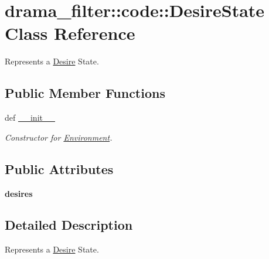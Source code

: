 \hypertarget{classdrama__filter_1_1code_1_1DesireState}{
\section{drama\_\-filter::code::DesireState Class Reference}
\label{classdrama__filter_1_1code_1_1DesireState}
}


Represents a \hyperlink{classdrama__filter_1_1code_1_1Desire}{Desire} State.  


\subsection*{Public Member Functions}
\begin{DoxyCompactItemize}
\item 
def \hyperlink{classdrama__filter_1_1code_1_1DesireState_a8dc2a08bd1ecc7a9fe73ea948b6bf937}{\_\-\_\-init\_\-\_\-}
\begin{DoxyCompactList}\small\item\em Constructor for \hyperlink{classdrama__filter_1_1code_1_1Environment}{Environment}. \end{DoxyCompactList}\end{DoxyCompactItemize}
\subsection*{Public Attributes}
\begin{DoxyCompactItemize}
\item 
\hypertarget{classdrama__filter_1_1code_1_1DesireState_a4cf65f888848721e4c45e668a805f94d}{
{\bfseries desires}}
\label{classdrama__filter_1_1code_1_1DesireState_a4cf65f888848721e4c45e668a805f94d}

\end{DoxyCompactItemize}


\subsection{Detailed Description}
Represents a \hyperlink{classdrama__filter_1_1code_1_1Desire}{Desire} State. 

